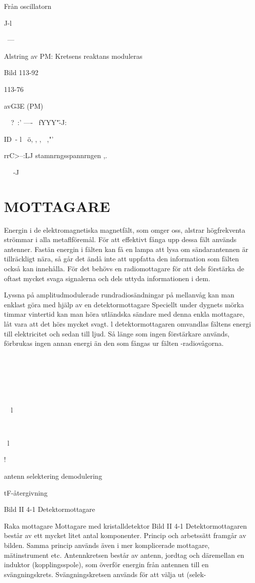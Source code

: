 \documentclass[a4paper,twoside,twocolumn,openright]{book}
\begin{document}
{{{{Från oscillatorn

J-l

~---

Alstring av PM:
Kretsens reaktans
moduleras

Bild 113-92

113-76

avG3E (PM)

~~?~:' ----~
fYYY"\r -J:

ID~- l~ ö, , , ~,"'

rrC>--:LJ stamnrngsspannrngen
,.

~ ~-J


\chapter{MOTTAGARE}
Energin i de elektromagnetiska magnetfält,
som omger oss, alstrar högfrekventa strömmar i alla metaflföremål. För att effektivt
fånga upp dessa fält används antenner.
Fastän energin i fälten kan få en lampa
att lysa om sändarantennen är tillräckligt
nära, så går det ändå inte att uppfatta den
information som fälten också kan innehålla.
För det behövs en radiomottagare för att
dels förstärka de oftast mycket svaga signalerna och dels uttyda informationen i dem.

Lyssna på amplitudmodulerade rundradiosändningar på mellanvåg kan man enklast
göra med hjälp av en detektormottagare
Speciellt under dygnets mörka timmar
vintertid kan man höra utländska sändare
med denna enkla mottagare, låt vara att det
hörs mycket svagt. l detektormottagaren
omvandlas fältens energi till elektricitet och
sedan till ljud. Så länge som ingen förstärkare används, förbrukas ingen annan energi
än den som fångas ur fälten -radiovågorna.

\

\

\

\ \
l

\

\
l

!

antenn selektering demodulering

tF-återgivning

Bild II 4-1 Detektormottagare

Raka mottagare
Mottagare med kristalldetektor
Bild II 4-1
Detektormottagaren består av ett mycket
litet antal komponenter. Princip och arbetssätt framgår av bilden. Samma princip används även i mer komplicerade mottagare,
mätinstrument etc. Antennkretsen består
av antenn, jordtag och däremellan en induktor (kopplingsspole), som överför energin
från antennen till en svängningskrets. Svängningskretsen används för att välja ut (selek-

}}}}
\end{document}
